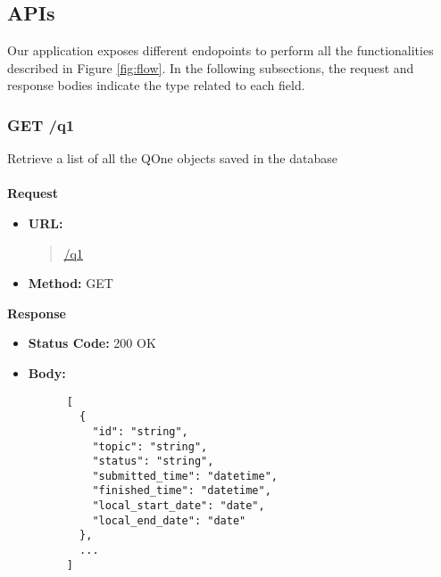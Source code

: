 \subsection{APIs}
Our application exposes different endopoints to perform all the functionalities described
in Figure \ref{fig:flow}. In the following subsections, the request and response bodies indicate
the type related to each field.

\subsubsection{GET /q1}
Retrieve a list of all the QOne objects saved in the database \\\\
\textbf{Request}
\begin{itemize}
  \item \textbf{URL:}
  \begin{quote}
    \url{/q1}
  \end{quote}
  \item \textbf{Method:} GET
\end{itemize}\leavevmode\newline
\textbf{Response}
\begin{itemize}
  \item \textbf{Status Code:} 200 OK
  \item \textbf{Body:}
    \begin{lstlisting}
      [
        {
          "id": "string",
          "topic": "string",
          "status": "string",
          "submitted_time": "datetime",
          "finished_time": "datetime",
          "local_start_date": "date",
          "local_end_date": "date"
        },
        ...
      ]
    \end{lstlisting}
\end{itemize}

